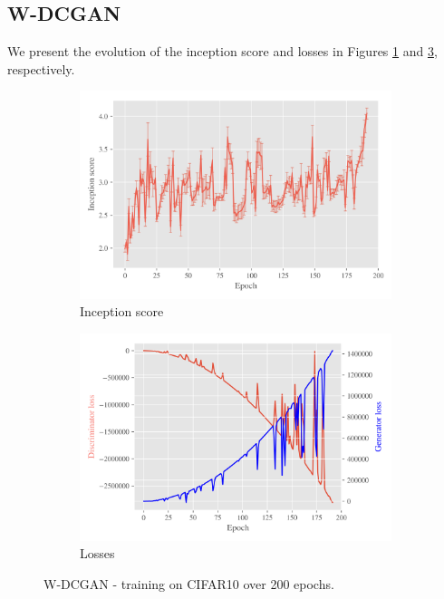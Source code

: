\subsection{W-DCGAN}
\label{sec:exp-w-dcgan}
We present the evolution of the inception score and losses in Figures \ref{fig:exp-w-dcgan-is} and \ref{fig:exp-w-dcgan-losses}, respectively.
   
\begin{figure}[t!]
    \centering
    \begin{subfigure}[t]{0.49\textwidth}
        \centering
		\includegraphics[width=\textwidth]{../code/results/figures/w-dcgan_cifar10_is.png}
		\caption{Inception score}
		\label{fig:exp-w-dcgan-is}
    \end{subfigure}
    \begin{subfigure}[t]{0.49\textwidth}
        \centering
        \includegraphics[width=\textwidth]{../code/results/figures/w-dcgan_cifar10_losses.png}
		\caption{Losses}
		\label{fig:exp-w-dcgan-losses}
    \end{subfigure}
    \caption{W-DCGAN - training on CIFAR10 over 200 epochs.}
\end{figure}